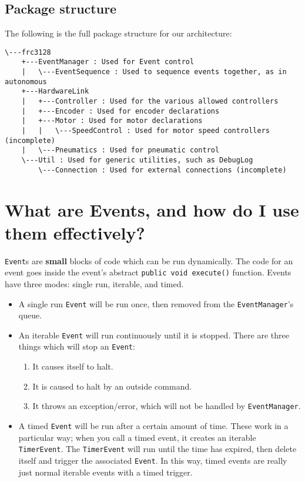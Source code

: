 \documentclass[a4paper]{article}
\begin{document}
\subsection{Package structure}
The following is the full package structure for our architecture:
\begin{verbatim}
\---frc3128
    +---EventManager : Used for Event control
    |   \---EventSequence : Used to sequence events together, as in autonomous
    +---HardwareLink
    |   +---Controller : Used for the various allowed controllers
    |   +---Encoder : Used for encoder declarations
    |   +---Motor : Used for motor declarations 
    |   |   \---SpeedControl : Used for motor speed controllers (incomplete)
    |   \---Pneumatics : Used for pneumatic control
    \---Util : Used for generic utilities, such as DebugLog
        \---Connection : Used for external connections (incomplete)
\end{verbatim}


\section{What are Events, and how do I use them effectively?}

\lstinline{Event}s are \textbf{small} blocks of code which can be run dynamically. The code for an event goes inside the event's abstract \lstinline{public void execute()} function. Events have three modes: single run, iterable, and timed. 
\begin{itemize}
	\item{A single run \lstinline{Event} will be run once, then removed from the \lstinline{EventManager}'s queue.}
	\item{An iterable \lstinline{Event} will run continuously until it is stopped. There are three things which will stop an \lstinline{Event}: \begin{enumerate}
		\item{It causes itself to halt.}
		\item{It is caused to halt by an outside command.}
		\item{It throws an exception/error, which will not be handled by \lstinline{EventManager}.}
		\end{enumerate}
	}
	\item{A timed \lstinline{Event} will be run after a certain amount of time. These work in a particular way; when you call a timed event, it creates an iterable \lstinline{TimerEvent}. The \lstinline{TimerEvent} will run until the time has expired, then delete itself and trigger the associated \lstinline{Event}. In this way, timed events are really just normal iterable events with a timed trigger.}
\end{itemize}
\end{document}
